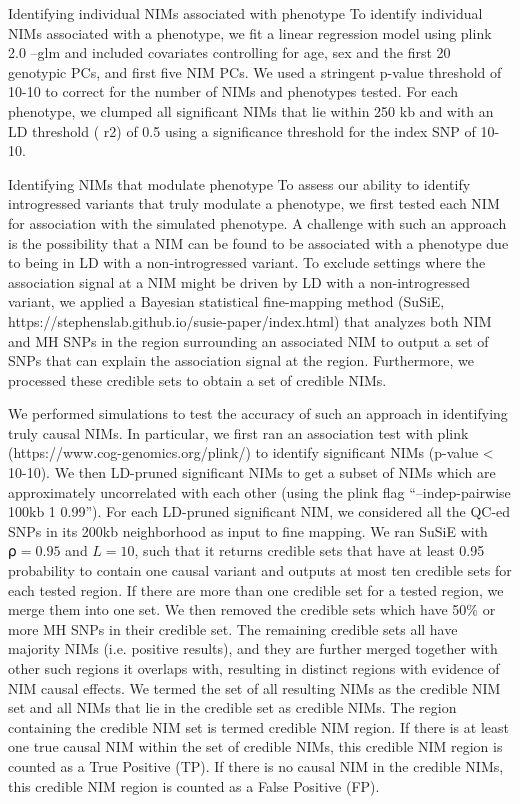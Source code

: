 Identifying individual NIMs associated with phenotype
To identify individual NIMs associated with a phenotype, we fit a linear regression model using plink 2.0 --glm and included covariates controlling for age, sex and the first 20 genotypic PCs, and first five NIM PCs. We used  a stringent p-value threshold of 10-10 to correct for the number of NIMs and phenotypes tested. For each phenotype, we clumped all significant NIMs that lie within 250 kb and with an LD threshold ( r2) of 0.5 using a significance threshold for the index SNP of 10-10.


Identifying NIMs that modulate phenotype
To assess our ability to identify introgressed variants that truly modulate a phenotype, we first tested each NIM for association with the simulated phenotype. A challenge with such an approach is the possibility that a NIM can be found to be associated with a phenotype due to being in LD with a non-introgressed variant. To exclude settings where the association signal at a NIM might be driven by LD with a non-introgressed variant, we applied a Bayesian statistical fine-mapping method (SuSiE, https://stephenslab.github.io/susie-paper/index.html) that analyzes both NIM and MH SNPs in the region surrounding an associated NIM to output a set of SNPs that can explain the association signal at the region. Furthermore, we processed these credible sets to obtain a set of credible NIMs. 

We performed simulations to test the accuracy of such an approach in identifying truly causal NIMs. In particular, we first ran an association test with plink (https://www.cog-genomics.org/plink/) to identify significant NIMs (p-value < 10-10). We then LD-pruned significant NIMs to get a subset of NIMs which are approximately uncorrelated with each other (using the plink flag “--indep-pairwise 100kb 1 0.99”). For each LD-pruned significant NIM, we considered all the QC-ed SNPs in its 200kb neighborhood as input to fine mapping. We ran SuSiE with $⍴ = 0.95$ and $L = 10$, such that it returns credible sets that have at least 0.95 probability to contain one causal variant and outputs at most ten credible sets for each tested region. If there are more than one credible set for a tested region, we merge them into one set. We then removed the credible sets which have 50\% or more MH SNPs in their credible set. The remaining credible sets all have majority NIMs (i.e. positive results), and they are further merged together with other such regions it overlaps with, resulting in distinct regions with evidence of NIM causal effects. We termed the set of all resulting NIMs as the credible NIM set and all NIMs that lie in the credible set as credible NIMs. The region containing the credible NIM set is termed credible NIM region. If there is at least one true causal NIM within the set of credible NIMs, this credible NIM region is counted as a True Positive (TP). If there is no causal NIM in the credible NIMs, this credible NIM region is counted as a False Positive (FP). 
 
